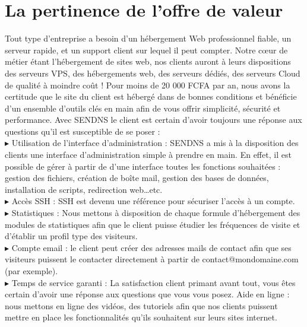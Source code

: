 \documentclass[a4paper, 12pt]{report}
\begin{document}
\section{La pertinence de l’offre de valeur}
\noindent Tout type d'entreprise a besoin d'un hébergement Web professionnel fiable, un serveur rapide, et un support client sur lequel il peut compter.
Notre cœur de métier étant l’hébergement de sites web, nos clients auront à leurs dispositions des serveurs VPS, des hébergements web, des serveurs dédiés, des serveurs Cloud de qualité à moindre coût !
Pour moins de 20 000 FCFA par an, nous avons la certitude que le site du client est hébergé dans de bonnes conditions et bénéficie d’un ensemble d’outils clés en main afin de vous offrir simplicité, sécurité et performance. 
Avec SENDNS le client est certain d’avoir toujours une réponse aux questions qu’il est susceptible de se poser :
\\
\noindent $\blacktriangleright$ Utilisation de l’interface d’administration : SENDNS a mis à la disposition des clients une interface d’administration simple à prendre en main. En effet, il est possible de gérer à partir de d’une interface toutes les fonctions souhaitées : gestion des fichiers, création de boîte mail, gestion des bases de données, installation de scripts, redirection web…etc.
\\
\noindent $\blacktriangleright$ Accès SSH : SSH est devenu une référence pour sécuriser l’accès à un compte.
\\
\noindent $\blacktriangleright$ Statistiques : Nous mettons à disposition de chaque formule d’hébergement des modules de statistiques afin que le client puisse étudier les fréquences de visite et d’établir un profil type des visiteurs.
\\
\noindent $\blacktriangleright$ Compte email : le client peut créer des adresses mails de contact afin que ses visiteurs   puissent le contacter directement à partir de contact@mondomaine.com (par exemple).
\\
\noindent $\blacktriangleright$ Temps de service garanti : La satisfaction client primant avant tout, vous êtes certain d’avoir une réponse aux questions que vous vous posez.
Aide en ligne : nous mettons en ligne des vidéos, des tutoriels afin que nos clients puissent mettre en place les fonctionnalités qu’ils souhaitent sur leurs sites internet. 
\end{document}
